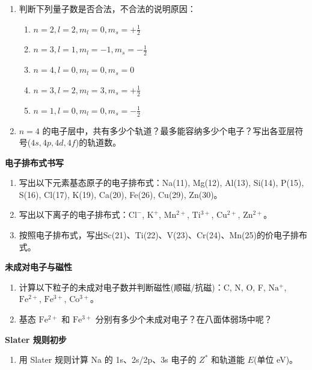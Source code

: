\documentclass[a4paper,11pt]{ctexart}
\providecommand{\tightlist}{\setlength{\itemsep}{0pt}\setlength{\parskip}{0pt}}
\newcommand{\箭}{\ensuremath{\rightarrow}}
\newcommand{\左箭}{\ensuremath{\leftarrow}}
\newcommand{\上箭}{\ensuremath{\uparrow}}
\newcommand{\下箭}{\ensuremath{\downarrow}}
\newcommand{\衡}{\ensuremath{\rightleftharpoons}}
\newcommand{\双箭}{\ensuremath{\leftrightarrow}}
\newcommand{\约等于}{\ensuremath{\approx}}
\newcommand{\小于等于}{\ensuremath{\leq}}
\newcommand{\大于等于}{\ensuremath{\geq}}
\newcommand{\不等于}{\ensuremath{\neq}}
\newcommand{\西格马}{\ensuremath{\sigma}}
\newcommand{\派}{\ensuremath{\pi}}
\begin{document}
\begin{enumerate}
\def\labelenumi{\arabic{enumi}.}
\tightlist
\item
  判断下列量子数是否合法，不合法的说明原因：

  \begin{enumerate}
  \def\labelenumii{(\alph{enumii})}
  \tightlist
  \item
    \(n=2, l=2, m_l=0, m_s=+\frac{1}{2}\)
  \item
    \(n=3, l=1, m_l=-1, m_s=-\frac{1}{2}\)
  \item
    \(n=4, l=0, m_l=0, m_s=0\)
  \item
    \(n=3, l=2, m_l=3, m_s=+\frac{1}{2}\)
  \item
    \(n=1, l=0, m_l=0, m_s=-\frac{1}{2}\)
  \end{enumerate}
\item
  \(n=4\) 的电子层中，共有多少个轨道？最多能容纳多少个电子？写出各亚层符号(\(4s, 4p, 4d, 4f\))的轨道数。
\end{enumerate}

\textbf{电子排布式书写}

\begin{enumerate}
\def\labelenumi{\arabic{enumi}.}
\setcounter{enumi}{2}
\item
  写出以下元素基态原子的电子排布式：Na(11), Mg(12), Al(13), Si(14), P(15), S(16), Cl(17), K(19), Ca(20), Fe(26), Cu(29), Zn(30)。
\item
  写出以下离子的电子排布式：\(\mathrm{Cl^-}\), \(\mathrm{K^+}\), \(\mathrm{Mn^{2+}}\), \(\mathrm{Ti^{3+}}\), \(\mathrm{Cu^{2+}}\), \(\mathrm{Zn^{2+}}\)。
\item
  按照电子排布式，写出Sc(21)、Ti(22)、V(23)、Cr(24)、Mn(25)的价电子排布式。
\end{enumerate}

\textbf{未成对电子与磁性}

\begin{enumerate}
\def\labelenumi{\arabic{enumi}.}
\setcounter{enumi}{5}
\item
  计算以下粒子的未成对电子数并判断磁性(顺磁/抗磁)：C, N, O, F, \(\mathrm{Na^+}\), \(\mathrm{Fe^{2+}}\), \(\mathrm{Fe^{3+}}\), \(\mathrm{Co^{3+}}\)。
\item
  基态 \(\mathrm{Fe^{2+}}\) 和 \(\mathrm{Fe^{3+}}\) 分别有多少个未成对电子？在八面体弱场中呢？
\end{enumerate}

\textbf{Slater 规则初步}

\begin{enumerate}
\def\labelenumi{\arabic{enumi}.}
\setcounter{enumi}{7}
\tightlist
\item
  用 Slater 规则计算 Na 的 1s、2s/2p、3s 电子的 \(Z^*\) 和轨道能 \(E\)(单位 eV)。
\end{enumerate}
\end{document}
